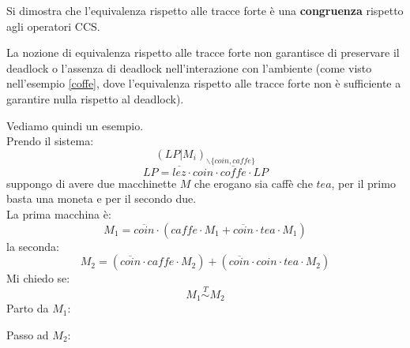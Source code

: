 \begin{definizione}
  Si dimostra che l'equivalenza rispetto alle tracce forte è una
  \textbf{congruenza} rispetto agli operatori CCS.
\end{definizione} \vspace{5mm} %
\begin{definizione}
  La nozione di equivalenza rispetto alle tracce forte non garantisce di
  preservare il deadlock o l'assenza di deadlock nell'interazione con l'ambiente
  (come visto nell'esempio \ref{coffe}, dove l'equivalenza rispetto alle tracce
  forte non è sufficiente a garantire nulla rispetto al deadlock).
\end{definizione} \vspace{5mm} %
\begin{esempio}
  Vediamo quindi un esempio.\\
  Prendo il sistema:
  \[(LP|M_i)_{\backslash\{coin, caffe\}}\]
  \[LP=\overline{lez}\cdot coin\cdot \overline{coffe}\cdot LP\]
  suppongo di avere due macchinette $M$ che erogano sia caffè che $tea$, per il
  primo basta una moneta e per il secondo due.\\
  La prima macchina è:
  \[M_1=\overline{coin}\cdot(caffe\cdot M_1+\overline{coin}\cdot tea\cdot M_1)\]
  la seconda:
  \[M_2=(\overline{coin}\cdot caffe\cdot M_2)+(\overline{coin}\cdot coin \cdot
    tea\cdot M_2)\]
  Mi chiedo se:
  \[M_1\stackrel{T}{\sim} M_2\]
  Parto da $M_1$:
  \begin{center}
  \end{center}
  Passo ad $M_2$:
   \begin{center}
\end{center}
\end{esempio}
